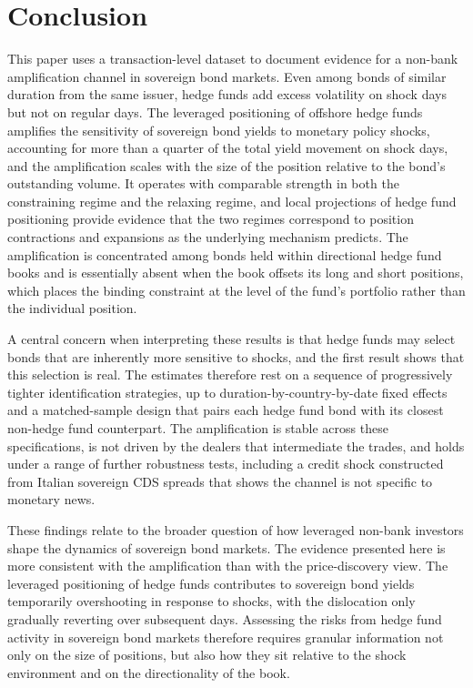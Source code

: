 \documentclass[english, 11pt, oneside]{article}
\begin{document}
\section{Conclusion}
\label{sec:conclusion}
This paper uses a transaction-level dataset to document evidence for a non-bank amplification channel in sovereign bond markets. Even among bonds of similar duration from the same issuer, hedge funds add excess volatility on shock days but not on regular days. The leveraged positioning of offshore hedge funds amplifies the sensitivity of sovereign bond yields to monetary policy shocks, accounting for more than a quarter of the total yield movement on shock days, and the amplification scales with the size of the position relative to the bond's outstanding volume. It operates with comparable strength in both the constraining regime and the relaxing regime, and local projections of hedge fund positioning provide evidence that the two regimes correspond to position contractions and expansions as the underlying mechanism predicts. The amplification is concentrated among bonds held within directional hedge fund books and is essentially absent when the book offsets its long and short positions, which places the binding constraint at the level of the fund's portfolio rather than the individual position.

A central concern when interpreting these results is that hedge funds may select bonds that are inherently more sensitive to shocks, and the first result shows that this selection is real. The estimates therefore rest on a sequence of progressively tighter identification strategies, up to duration-by-country-by-date fixed effects and a matched-sample design that pairs each hedge fund bond with its closest non-hedge fund counterpart. The amplification is stable across these specifications, is not driven by the dealers that intermediate the trades, and holds under a range of further robustness tests, including a credit shock constructed from Italian sovereign CDS spreads that shows the channel is not specific to monetary news. 

These findings relate to the broader question of how leveraged non-bank investors shape the dynamics of sovereign bond markets. The evidence presented here is more consistent with the amplification than with the price-discovery view. The leveraged positioning of hedge funds contributes to sovereign bond yields temporarily overshooting in response to shocks, with the dislocation only gradually reverting over subsequent days. Assessing the risks from hedge fund activity in sovereign bond markets therefore requires granular information not only on the size of positions, but also how they sit relative to the shock environment and on the directionality of the book.
\end{document}
